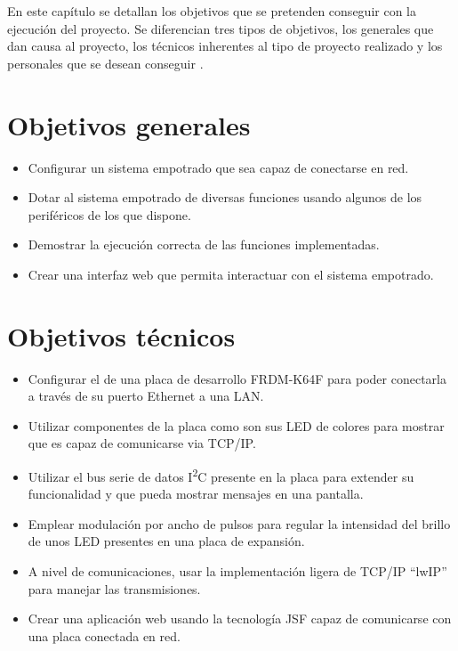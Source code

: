 \label{ch:objetivos}

En este capítulo se detallan los objetivos que se pretenden conseguir con la
ejecución del proyecto. Se diferencian tres tipos de objetivos, los generales
que dan causa al proyecto, los técnicos inherentes al tipo de proyecto realizado
y los personales que se desean conseguir .

\section{Objetivos generales}\label{sec:obj_generales}
\begin{itemize}
  \item Configurar un sistema empotrado que sea capaz de conectarse en red.
  \item Dotar al sistema empotrado de diversas funciones usando algunos de los
  periféricos de los que dispone.
  \item Demostrar la ejecución correcta de las funciones implementadas.
  \item Crear una interfaz web que permita interactuar con el sistema empotrado.
\end{itemize}

\section{Objetivos técnicos}\label{sec:obj_tecnicos}
\begin{itemize}
  \item Configurar el  de una placa de desarrollo
  FRDM-K64F para poder conectarla a través de su puerto Ethernet a una LAN.
  \item Utilizar componentes  de la placa como 
  son sus LED de colores para mostrar que es capaz de comunicarse via TCP/IP.
  \item Utilizar el bus serie de datos I\textsuperscript{2}C presente en la
  placa para extender su funcionalidad y que pueda mostrar mensajes en una
  pantalla.
  \item Emplear modulación por ancho de pulsos para regular la intensidad del
  brillo de unos LED presentes en una placa de expansión.
  \item A nivel de comunicaciones, usar la implementación ligera de 
  TCP/IP ``lwIP'' para manejar las transmisiones.
  \item Crear una aplicación web usando la tecnología JSF capaz de comunicarse
  con una placa conectada en red.
\end{itemize}

